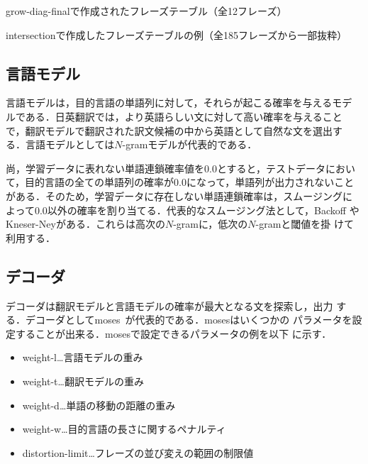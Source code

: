\documentclass[japanese]{jnlp_1.4}
\begin{document}
\begin{table}[t]
\caption{grow-diag-finalで作成されたフレーズテーブル（全12フレーズ）}
\label{tbl:作成されたフレーズテーブルの例(grow-diag-final)}

\end{table}
\begin{table}[t]
\caption{intersectionで作成したフレーズテーブルの例（全185フレーズから一部抜粋）}
\label{tbl:作成されたフレーズテーブルの例(intersection)}

\end{table}





\subsection{言語モデル}

言語モデルは，目的言語の単語列に対して，それらが起こる確率を与えるモデ
ルである．日英翻訳では，より英語らしい文に対して高い確率を与えること
で，翻訳モデルで翻訳された訳文候補の中から英語として自然な文を選出す
る．言語モデルとしては$N$-gramモデルが代表的である．

尚，学習データに表れない単語連鎖確率値を0.0とすると，テストデータにおい
て，目的言語の全ての単語列の確率が0.0になって，単語列が出力されないこと
がある．そのため，学習データに存在しない単語連鎖確率は，スムージングに
よって0.0以外の確率を割り当てる．代表的なスムージング法として，Backoff
やKneser-Neyがある．これらは高次の$N$-gramに，低次の$N$-gramと閾値を掛
けて利用する．

\subsection{デコーダ}

デコーダは翻訳モデルと言語モデルの確率が最大となる文を探索し，出力
する．デコーダとしてmoses~\cite{moses}が代表的である．mosesはいくつかの
パラメータを設定することが出来る．mosesで設定できるパラメータの例を以下
に示す．

\begin{itemize}
\item weight-l…言語モデルの重み 
\item weight-t…翻訳モデルの重み
\item weight-d…単語の移動の距離の重み
\item weight-w…目的言語の長さに関するペナルティ
\item distortion-limit…フレーズの並び変えの範囲の制限値
\end{itemize}
\end{document}
